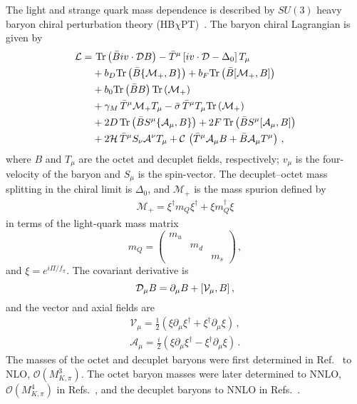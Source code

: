 \documentclass[twocolumn,nofootinbib,prd,aps,superscriptaddress,tightenlines]{revtex4}
\def\Tr{\textrm{Tr}}
\def\mc#1{{\mathcal{#1}}}
\def\D{\Delta}
\def\s{\sigma}
\begin{document}
The light and strange quark mass dependence is described by $SU(3)$ heavy baryon chiral perturbation theory (HB$\chi$PT)~\cite{Jenkins:1990jv}.  The baryon chiral Lagrangian is given by
\begin{align}\label{eq:HBLag}
\mathcal{L} =&\ \Tr \left( \bar{B} i v \cdot {\cal D} B \right)
	- \bar{T}^\mu \left[ i v \cdot {\cal D} -\D_0 \right] T_\mu
\nonumber\\&
	+b_D \Tr \left( \bar{B} \{\mc{M}_+,  B\} \right)
	+b_F \Tr \left( \bar{B} [\mc{M}_+,  B]  \right)
\nonumber\\&
	+b_0 \Tr \left( \bar{B} B \right) \Tr \left( \mc{M}_+ \right)
\nonumber\\&
	+\gamma_M\, \bar{T}^\mu \mc{M}_+ T_\mu
	-\bar{\s}\, \bar{T}^\mu T_\mu \Tr \left( \mc{M}_+ \right)
\nonumber\\&
	+2D\, \Tr \left( \bar{B} S^\mu \{\mc{A}_\mu, B\} \right)
	+2F\, \Tr \left( \bar{B} S^\mu [\mc{A}_\mu, B] \right)
\nonumber\\&
	+2\mc{H}\, \bar{T}^\mu S_\nu \mc{A}^\nu T_\mu
	+\mc{C}\, \left( \bar{T}^\mu \mc{A}_\mu B + \bar{B} \mc{A}_\mu T^\mu \right)\, ,
\end{align}
where $B$ and $T_\mu$ are the octet and decuplet fields, respectively; $v_\mu$ is the four-velocity of the baryon and $S_\mu$ is the spin-vector.  The decuplet--octet mass splitting in the chiral limit is $\D_0$, and $\mc{M}_+$ is the mass spurion defined by
\begin{align}
	&\mc{M}_+ = %
	\xi^\dagger m_Q \xi^\dagger + \xi m_Q^\dagger \xi &%
\end{align}
in terms of the light-quark mass matrix
\begin{equation}
m_Q = \begin{pmatrix}
	m_u &&\\
	&m_d&\\
	&&m_s
	\end{pmatrix}\, ,
\end{equation}
and $\xi = e^{i \Pi/ f_\pi}$.
The covariant derivative is
\begin{equation}
	{\cal D}_\mu B = \partial_\mu B + [\mc{V}_\mu , B]\, ,
\end{equation}
and the vector and axial fields are
\begin{align}
	&\mc{V}_\mu = \frac{1}{2} \left( \xi \partial_\mu \xi^\dagger + \xi^\dagger \partial_\mu \xi \right)\, ,&\\
	&\mc{A}_\mu = \frac{i}{2} \left( \xi \partial_\mu \xi^\dagger - \xi^\dagger \partial_\mu \xi \right)\, .&
\end{align}
The masses of the octet and decuplet baryons were first determined in Ref.~\cite{Jenkins:1991ts} to NLO, $\mc{O}(M_{K,\pi}^3)$.  The octet baryon masses were later determined to NNLO, $\mc{O}(M_{K,\pi}^4)$ in Refs.~\cite{Lebed:1994gt,Borasoy:1996bx,WalkerLoud:2004hf}, and the decuplet baryons to NNLO in Refs.~\cite{Lebed:1993yu,Tiburzi:2004rh}.  
\end{document}
